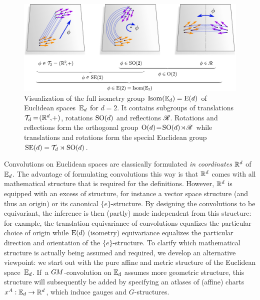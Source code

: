\begin{figure}
    \centering
    \includegraphics[width=1.\textwidth]{figures/isometry_plane.pdf}
    \vspace*{.1ex}
    \caption{\small
        Visualization of the full isometry group $\operatorname{Isom}(\mathbb{E}_d) = \operatorname{E}(d)$ of Euclidean spaces~$\mathbb{E}_d$ for $d=2$.
        It contains subgroups of translations $\mathcal{T}_d \mkern-1mu=\! (\mathbb{R}^d,\mkern-2mu+)$, rotations $\operatorname{SO}(d)$ and reflections $\mathscr{R}$.
        Rotations and reflections form the orthogonal group ${\operatorname{O}(d) \!=\! \operatorname{SO}(d) \!\rtimes\! \mathscr{R}}$ while translations and rotations form the special Euclidean group $\operatorname{SE}(d) = \mathcal{T}_d \rtimes \operatorname{SO}(d)$.
     }
    \label{fig:isometries_plane}
\end{figure}

Convolutions on Euclidean spaces are classically formulated \emph{in coordinates} $\mathbb{R}^d$ of $\mathbb{E}_d$.
The advantage of formulating convolutions this way is that $\mathbb{R}^d$ comes with all mathematical structure that is required for the definitions.
However, $\mathbb{R}^d$ is equipped with an excess of structure, for instance a vector space structure (and thus an origin) or its canonical $\{e\}$-structure.
By designing the convolutions to be equivariant, the inference is then (partly) made independent from this structure:
for example, the translation equivariance of convolutions equalizes the particular choice of origin while $\operatorname{E}(d)$ (isometry) equivariance equalizes the particular direction and orientation of the $\{e\}$-structure.
To clarify which mathematical structure is actually being assumed and required, we develop an alternative viewpoint:
we start out with the pure affine and metric structure of the Euclidean space~$\mathbb{E}_d$.
If~a $G\mkern-1.4muM$-convolution on $\mathbb{E}_d$ assumes more geometric structure, this structure will subsequently be added by specifying an atlases of (affine) charts $x^A: \mathbb{E}_d \to \mathbb{R}^d$, which induce gauges and $G$-structures.

\pagebreak

\etocsettocstyle{}{} %
\localtableofcontents


